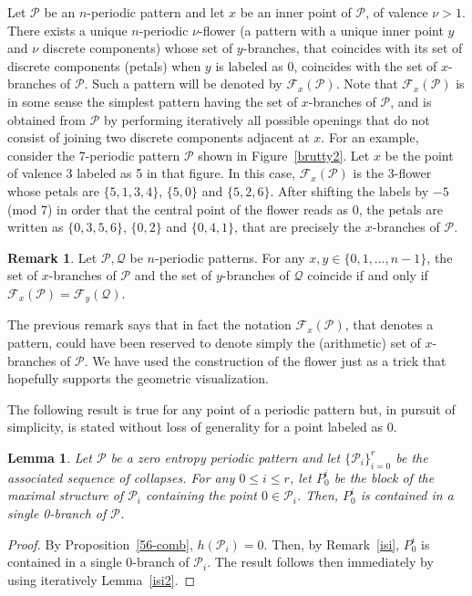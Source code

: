 \documentclass[a4paper]{amsart}
\newtheorem{lemma}[theorem]{Lemma}
\theoremstyle{definition}
\newtheorem{remark}[theorem]{Remark}
\begin{document}
Let $\mathcal{P}$ be an $n$-periodic pattern and let $x$ be an inner point of $\mathcal{P}$, of valence $\nu>1$. There exists a unique $n$-periodic $\nu$-flower (a pattern with a unique inner point $y$ and $\nu$ discrete components) whose set of $y$-branches, that coincides with its set of discrete components (petals) when $y$ is labeled as 0, coincides with the set of $x$-branches of $\mathcal{P}$. Such a pattern will be denoted by $\mathcal{F}_{x}(\mathcal{P})$. Note that $\mathcal{F}_{x}(\mathcal{P})$ is in some sense the simplest pattern having the set of $x$-branches of $\mathcal{P}$, and is obtained from $\mathcal{P}$ by performing iteratively all possible openings that do not consist of joining two discrete components adjacent at $x$. For an example, consider the 7-periodic pattern $\mathcal{P}$ shown in Figure~\ref{brutty2}. Let $x$ be the point of valence 3 labeled as 5 in that figure. In this case, $\mathcal{F}_{x}(\mathcal{P})$ is the 3-flower whose petals are $\{5,1,3,4\}$, $\{5,0\}$ and $\{5,2,6\}$. After shifting the labels by $-5$ (mod 7) in order that the central point of the flower reads as 0, the petals are written as $\{0,3,5,6\}$, $\{0,2\}$ and $\{0,4,1\}$, that are precisely the $x$-branches of $\mathcal{P}$.

\begin{remark}\label{trivialet}
Let $\mathcal{P},\mathcal{Q}$ be $n$-periodic patterns. For any $x,y\in\{0,1,\ldots,n-1\}$, the set of $x$-branches of $\mathcal{P}$ and the set of $y$-branches of $\mathcal{Q}$ coincide if and only if $\mathcal{F}_{x}(\mathcal{P})=\mathcal{F}_{y}(\mathcal{Q})$.
\end{remark}

The previous remark says that in fact the notation $\mathcal{F}_{x}(\mathcal{P})$, that denotes a pattern, could have been reserved to denote simply the (arithmetic) set of $x$-branches of $\mathcal{P}$. We have used the construction of the flower just as a trick that hopefully supports the geometric visualization.

The following result is true for any point of a periodic pattern but, in pursuit of simplicity, is stated without loss of generality for a point labeled as 0.

\begin{lemma}\label{isi3}
Let $\mathcal{P}$ be a zero entropy periodic pattern and let $\{\mathcal{P}_i\}_{i=0}^r$ be the associated sequence of collapses. For any $0\le i\le r$, let $P_0^i$ be the block of the maximal structure of $\mathcal{P}_i$ containing the point $0\in\mathcal{P}_i$. Then, $P_0^i$ is contained in a single 0-branch of $\mathcal{P}$.
\end{lemma}
\begin{proof}
By Proposition~\ref{56-comb}, $h(\mathcal{P}_i)=0$. Then, by Remark~\ref{isi}, $P_0^i$ is contained in a single 0-branch of $\mathcal{P}_i$. The result follows then immediately by using iteratively Lemma~\ref{isi2}.
\end{proof}
\end{document}
